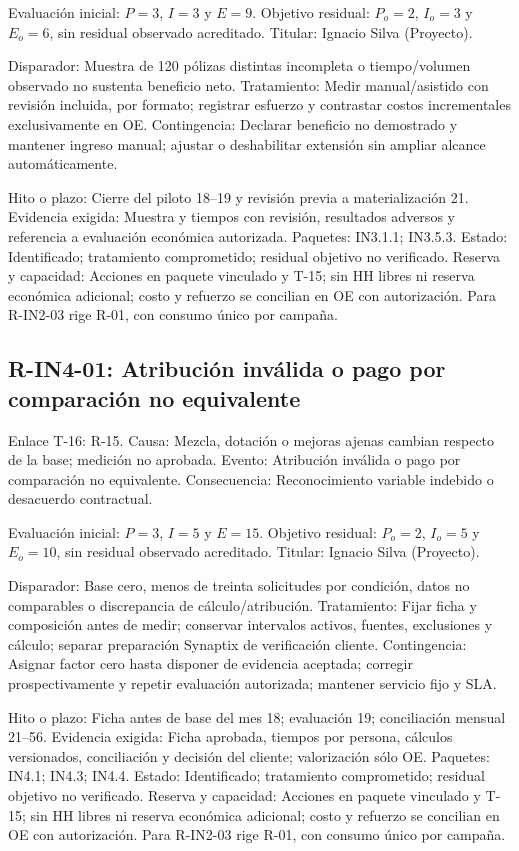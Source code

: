 Evaluación inicial: $P=3$, $I=3$ y $E=9$. Objetivo residual: $P_o=2$, $I_o=3$ y $E_o=6$, sin residual observado acreditado. Titular: Ignacio Silva (Proyecto).

Disparador: Muestra de 120 pólizas distintas incompleta o tiempo/volumen observado no sustenta beneficio neto. Tratamiento: Medir manual/asistido con revisión incluida, por formato; registrar esfuerzo y contrastar costos incrementales exclusivamente en OE. Contingencia: Declarar beneficio no demostrado y mantener ingreso manual; ajustar o deshabilitar extensión sin ampliar alcance automáticamente.

Hito o plazo: Cierre del piloto 18--19 y revisión previa a materialización 21. Evidencia exigida: Muestra y tiempos con revisión, resultados adversos y referencia a evaluación económica autorizada. Paquetes: IN3.1.1; IN3.5.3. Estado: Identificado; tratamiento comprometido; residual objetivo no verificado. Reserva y capacidad: Acciones en paquete vinculado y T-15; sin HH libres ni reserva económica adicional; costo y refuerzo se concilian en OE con autorización. Para R-IN2-03 rige R-01, con consumo único por campaña.

\subsection{R-IN4-01: Atribución inválida o pago por comparación no equivalente}
Enlace T-16: R-15. Causa: Mezcla, dotación o mejoras ajenas cambian respecto de la base; medición no aprobada. Evento: Atribución inválida o pago por comparación no equivalente. Consecuencia: Reconocimiento variable indebido o desacuerdo contractual.

Evaluación inicial: $P=3$, $I=5$ y $E=15$. Objetivo residual: $P_o=2$, $I_o=5$ y $E_o=10$, sin residual observado acreditado. Titular: Ignacio Silva (Proyecto).

Disparador: Base cero, menos de treinta solicitudes por condición, datos no comparables o discrepancia de cálculo/atribución. Tratamiento: Fijar ficha y composición antes de medir; conservar intervalos activos, fuentes, exclusiones y cálculo; separar preparación Synaptix de verificación cliente. Contingencia: Asignar factor cero hasta disponer de evidencia aceptada; corregir prospectivamente y repetir evaluación autorizada; mantener servicio fijo y SLA.

Hito o plazo: Ficha antes de base del mes 18; evaluación 19; conciliación mensual 21--56. Evidencia exigida: Ficha aprobada, tiempos por persona, cálculos versionados, conciliación y decisión del cliente; valorización sólo OE. Paquetes: IN4.1; IN4.3; IN4.4. Estado: Identificado; tratamiento comprometido; residual objetivo no verificado. Reserva y capacidad: Acciones en paquete vinculado y T-15; sin HH libres ni reserva económica adicional; costo y refuerzo se concilian en OE con autorización. Para R-IN2-03 rige R-01, con consumo único por campaña.

